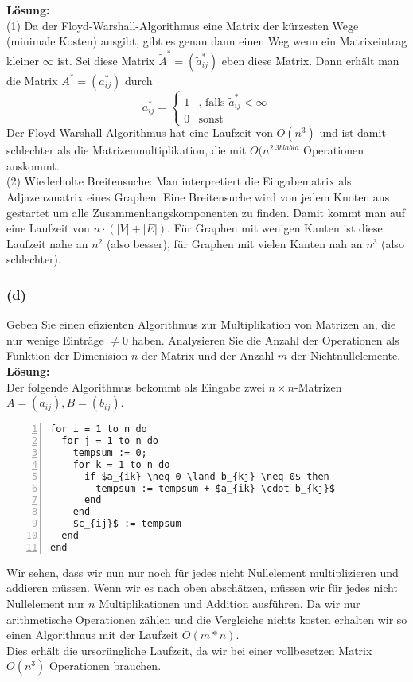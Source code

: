 \documentclass[11pt,a4paper,ngerman]{article}
\begin{document}
\textbf{Lösung:}\\
(1) Da der Floyd-Warshall-Algorithmus eine Matrix der kürzesten Wege (minimale Kosten) ausgibt, gibt es
genau dann einen Weg wenn ein Matrixeintrag kleiner $\infty$ ist.
Sei diese Matrix $\tilde{A}^* = (\tilde{a}^*_{ij})$ eben diese Matrix. Dann erhält man die Matrix $A^* = (a^*_{ij})$ durch
\begin{equation*}
a^*_{ij} = \begin{cases}
              1 & \text{, falls $\tilde{a}^*_{ij} < \infty$} \\
              0 & \text{sonst}
            \end{cases}
\end{equation*}
Der Floyd-Warshall-Algorithmus hat eine Laufzeit von $O(n^3)$ und ist damit schlechter als die Matrizenmultiplikation, die mit $O(n^{2.3blabla}$ Operationen auskommt.\\
(2) Wiederholte Breitensuche:  Man interpretiert die Eingabematrix als Adjazenzmatrix eines Graphen. Eine Breitensuche wird von jedem Knoten aus gestartet um alle
Zusammenhangskomponenten zu finden. Damit kommt man auf eine Laufzeit von $n \cdot (|V| +|E|)$.
Für Graphen mit wenigen Kanten ist diese Laufzeit nahe an $n^2$ (also besser), für Graphen mit vielen Kanten nah an $n^3$ (also schlechter).
\subsubsection*{(d)}

Geben Sie einen efizienten Algorithmus zur Multiplikation von Matrizen an, die nur wenige Einträge $\not= 0$ haben. Analysieren Sie die Anzahl der Operationen
als Funktion der Dimenision $n$ der Matrix und der Anzahl $m$ der Nichtnullelemente.\\

\textbf{Lösung:}\\
Der folgende Algorithmus bekommt als Eingabe zwei $n \times n$-Matrizen $A = (a_{ij}), B = (b_{ij})$.
\begin{lstlisting}[numbers=left]
for i = 1 to n do
  for j = 1 to n do
    tempsum := 0;
    for k = 1 to n do
      if $a_{ik} \neq 0 \land b_{kj} \neq 0$ then
        tempsum := tempsum + $a_{ik} \cdot b_{kj}$
      end
    end
    $c_{ij}$ := tempsum
  end
end
\end{lstlisting}

Wir sehen, dass wir nun nur noch für jedes nicht Nullelement multiplizieren und addieren müssen. Wenn wir es nach oben abschätzen,
müssen wir für jedes nicht Nullelement nur $n$ Multiplikationen und Addition ausführen. Da wir nur arithmetische Operationen zählen
und die Vergleiche nichts kosten erhalten wir so einen Algorithmus mit der Laufzeit $O(m*n)$.\\

Dies erhält die ursorüngliche Laufzeit, da wir bei einer vollbesetzen Matrix $O(n^3)$ Operationen brauchen.
\label{LastPage}
\end{document}
